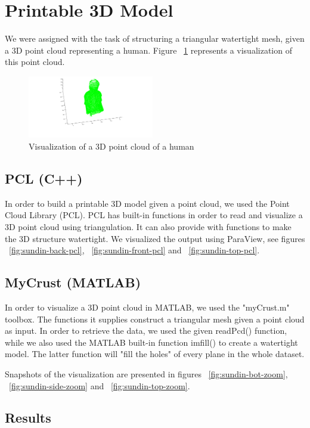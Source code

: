 \section{Printable 3D Model}

We were assigned with the task of structuring a triangular watertight mesh, given a 3D point cloud representing a human.
Figure ~\ref{fig:sundin-pointcloud} represents a visualization of this point cloud.
\begin{figure}[ht!]
  \centering
    \includegraphics[width=0.49\textwidth]
    {figures/pointCloud_sundin.png}
    \caption{Visualization of a 3D point cloud of a human}
    \label{fig:sundin-pointcloud}
\end{figure}


\subsection{PCL (C++)}
In order to build a printable 3D model given a point cloud, we used the Point Cloud Library (PCL)\cite{pcl}. PCL has built-in functions in order to read and visualize a 3D point cloud using triangulation. It can also provide with functions to make the 3D structure watertight.
We visualized the output using ParaView, see figures ~\ref{fig:sundin-back-pcl}, ~\ref{fig:sundin-front-pcl} and ~\ref{fig:sundin-top-pcl}.

\subsection{MyCrust (MATLAB)}
In order to visualize a 3D point cloud in MATLAB, we used the "myCrust.m" toolbox. The functions it supplies construct a triangular mesh given a point cloud as input. In order to retrieve the data, we used the given readPcd() function, while we also used the MATLAB built-in function imfill() to create a watertight model. The latter function will "fill the holes" of every plane in the whole dataset. 

Snapshots of the visualization are presented in figures ~\ref{fig:sundin-bot-zoom}, ~\ref{fig:sundin-side-zoom} and ~\ref{fig:sundin-top-zoom}.
\subsection{Results} 


